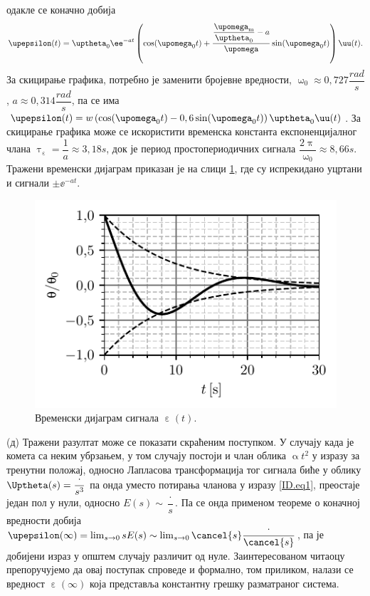одакле се коначно добија 
\begin{equation}
    \upepsilon(t) = 
    \uptheta_0 
    \ee^{-at}
    \left(
        \cos(\upomega_0 t)
        + 
        \dfrac{ \dfrac{\upomega_{\rm m}}{\uptheta_0} - a  }{\upomega}
        \sin(\upomega_0 t)
    \right) \uu(t).
\end{equation}
За скицирање графика, потребно је заменити бројевне вредности, 
$\upomega_0 \approx 0,727 \unit{\dfrac{rad}{s}}$, 
$a \approx 0,314 \unit{\dfrac{rad}{s}}$, па се има 
$\upepsilon(t) = w
\left(
    \cos(\upomega_0 t) 
    -
    0,6\sin(\upomega_0 t)
\right) 
\uptheta_0 
\uu(t)$. За скицирање графика може се искористити временска константа експоненцијалног члана 
$\uptau_{\upepsilon} = \dfrac{1}{a} \approx 3,18\unit{s}$, док је период простопериодичних сигнала 
$\dfrac{2\uppi}{\upomega_0} \approx 8,66\unit{s}$. Тражени временски дијаграм приказан је на слици
\ref{fig:\ID.res}, где су испрекидано уцртани и сигнали $\pm \ee^{-at}$.
\begin{figure}[ht!]
    \centering
    \includegraphics{fig/teleskop_plot.pdf}
    \caption{Временски дијаграм сигнала $\upepsilon(t)$.}
    \label{fig:\ID.res}
\end{figure}

(д) Тражени разултат може се показати скраћеним поступком. У случају када је комета са неким убрзањем, у том случају постоји и члан облика 
$\upalpha t^2$ у изразу за тренутни положај, односно Лапласова трансформација тог сигнала 
биће у облику $\Uptheta(s) = \dfrac{\cdot}{s^3}$ па онда уместо потирања чланова 
у изразу \ref{ID.eq1}, преостаје један пол у нули, односно $E(s) \sim \dfrac{\cdot}{s}$.
Па се онда применом теореме о коначној вредности добија 
$\upepsilon(\infty) = \lim_{s \to 0} s E(s) \sim \lim_{s \to 0} \cancel{s} \dfrac{\cdot}{\cancel{s}}$, па је 
добијени израз у општем случају различит од нуле. Заинтересованом читаоцу препоручујемо да овај поступак спроведе и 
формално, том приликом, налази се вредност $\upepsilon(\infty)$ која представља константну грешку разматраног система. 
